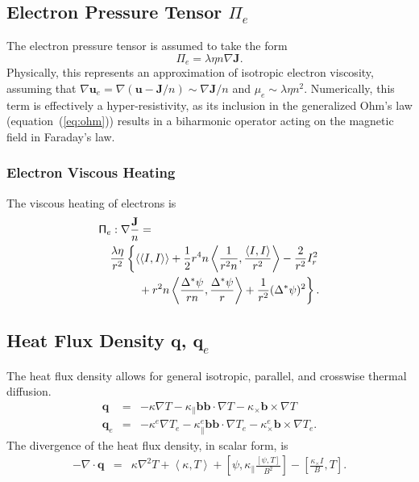 \documentclass[letterpaper]{book}
\renewcommand{\vec}[1]{\ensuremath{\mathbf{#1}}}
\newcommand{\tensor}[1]{\mathsf{#1}}
\renewcommand{\u}{\vec{u}}
\renewcommand{\j}{\vec{J}}
\newcommand{\q}{\vec{q}}
\renewcommand{\P}{\tensor{\Pi}}
\renewcommand{\b}{\vec{b}}
\newcommand{\grad}[1]{\nabla #1}
\renewcommand{\div}[1]{\nabla \cdot #1}
\newcommand{\dotdot}{:}
\newcommand{\gs}[1]{\Delta^* #1}
\newcommand{\lp}[1]{\nabla^2 #1}
\newcommand{\pb}[2]{\left[#1,#2\right]}
\newcommand{\ip}[2]{\left\langle  #1,#2\right\rangle}
\newcommand{\funcss}[2]{
  \left\langle\left\langle #1,#2 \right\rangle\right\rangle}
\begin{document}
\subsection{Electron Pressure Tensor $\P_e$ 
  \label{sec:electron_pressure_tensor}}

The electron pressure tensor is assumed to take the form
\begin{equation}
  \label{eq:electron_pressure_tensor}
  \P_e = \lambda \eta n \grad{\j}.
\end{equation}
Physically, this represents an approximation of isotropic electron
viscosity, assuming that $\grad{\u_e} = \grad{(\u - \j/n)} \sim
\grad{\j}/n$ and $\mu_e \sim \lambda \eta n^2$.  Numerically, this
term is effectively a hyper-resistivity, as its inclusion in the
generalized Ohm's law (equation~(\ref{eq:ohm})) results in a
biharmonic operator acting on the magnetic field in Faraday's law.

\subsubsection{Electron Viscous Heating}

The viscous heating of electrons is
\begin{eqnarray}
  \lefteqn{\P_e \dotdot \grad{\frac{\j}{n}} = }
  \\ & &
  \frac{\lambda \eta}{r^2} \left\{ 
  \funcss{I}{I} 
  + \frac{1}{2} r^4 n \ip{\frac{1}{r^2 n}}{\frac{\ip{I}{I}}{r^2}}
  -\frac{2}{r^2} I_r^2
  \nonumber \right. \\ & & \left. \mbox{}
  + r^2 n \ip{\frac{\gs{\psi}}{r n}}{\frac{\gs{\psi}}{r}}
  + \frac{1}{r^2} (\gs{\psi})^2 \right\}.
\end{eqnarray}


\subsection{Heat Flux Density $\q$, $\q_e$}
\label{sec:heat_flux}

The heat flux density allows for general isotropic, parallel, and
crosswise thermal diffusion.
\begin{eqnarray}
  \label{eq:heat_flux}
  \q & = & -\kappa \grad{T} - \kappa_\parallel \b \b \cdot \grad{T} 
  - \kappa_\times \b \times \grad{T} \\
  \q_e & = & -\kappa^e \grad{T_e} - \kappa_\parallel^e \b \b \cdot \grad{T_e}
  - \kappa_\times^e \b \times \grad{T_e}.
\end{eqnarray}
The divergence of the heat flux density, in scalar form, is
\begin{eqnarray}
  -\div \q & = & \kappa \lp{T} + \ip{\kappa}{T} 
  + \pb{\psi}{\kappa_\parallel \frac{\pb{\psi}{T}}{B^2}}
  - \pb{\frac{\kappa_\times I}{B}}{T}.
\end{eqnarray}
\end{document}
